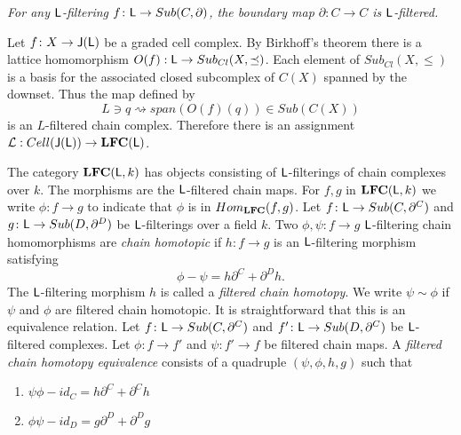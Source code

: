 \begin{ex}
{\em
For any ${\mathsf L}$-filtering $f\colon {\mathsf L} \to Sub(C,\partial)$,
the boundary map $\partial\colon C\to C$ is ${\mathsf L}$-filtered.
}
\end{ex}

\begin{ex}


Let $f\colon X\to {\mathsf J}({\mathsf L})$ be a graded cell complex.  By Birkhoff's theorem there is a lattice homomorphism $O(f):{\mathsf L}\to Sub_{Cl}(X,\preceq)$.  Each element of $Sub_{Cl}(X,\leq)$ is a basis for the associated closed subcomplex of $C(X)$ spanned by the downset.   Thus the map defined by $$L\ni q\rightsquigarrow span(O(f)(q))\in Sub(C(X))$$ is an $L$-filtered chain complex.  Therefore there is an assignment ${\mathcal L}:Cell({\mathsf J}({\mathsf L}))\to {\bf LFC}({\mathsf L})$.


 
\end{ex}






The category ${\bf LFC}({\mathsf L},k)$ has objects consisting of ${\mathsf L}$-filterings of chain complexes over $k$.  The morphisms are the ${\mathsf L}$-filtered chain maps.  For $f,g$ in ${\bf LFC}({\mathsf L},k)$ we write $\phi\colon f\to g$ to indicate that $\phi$ is in $Hom_{{\bf LFC}}(f,g)$.   Let $f \colon {\mathsf L}\to Sub(C,\partial^C)$ and $g \colon {\mathsf L}\to Sub(D,\partial^D)$ be ${\mathsf L}$-filterings over a field $k$.  
Two $\phi,\psi \colon f\to g$  ${\mathsf L}$-filtering chain homomorphisms are {\em chain homotopic} if $h\colon f\to g$ is an ${\mathsf L}$-filtering morphism satisfying
\[
\phi -\psi = h\partial^C+\partial^Dh.
\]
The ${\mathsf L}$-filtering morphism $h$ is called a {\em filtered chain homotopy}.  
We write $\psi\sim \phi$ if $\psi$ and $\phi$ are filtered chain homotopic.  
It is straightforward that this is an equivalence relation.    Let $f \colon {\mathsf L}\to Sub(C,\partial^C)$ and $f' \colon {\mathsf L}\to Sub(D,\partial^C)$ be ${\mathsf L}$-filtered complexes.  
Let $\phi \colon f\to f'$ and $\psi \colon f'\to f$ be filtered chain maps.  
A {\em filtered chain homotopy equivalence} consists of a quadruple $(\psi,\phi,h,g)$ such that 
\begin{enumerate}
\item $\psi\phi-id_C= h \partial^C + \partial^C h$
\item $\phi\psi-id_D = g \partial^D+\partial^D g$
\end{enumerate}



